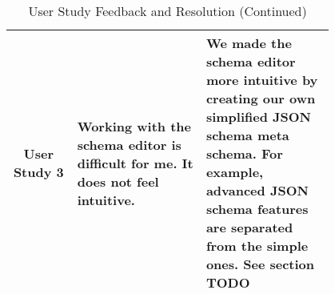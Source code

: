 \begin{table*}
    \centering
    \small %
    \setlength{\extrarowheight}{5pt} %
    \renewcommand{\arraystretch}{1.5} %
    \begin{tabular}{|c|p{0.4\linewidth}|p{0.4\linewidth}|}
        \hline
        User Study 3 & Working with the schema editor is difficult for me. It does not feel intuitive. &
        We made the schema editor more intuitive by creating our own simplified JSON schema meta schema.
        For example, advanced JSON schema features are separated from the simple ones.
        See section TODO \\
        \cline{2-3}

        \hline
    \end{tabular}
    \caption*{User Study Feedback and Resolution (Continued)} \label{tab:user_study3}

\end{table*}

